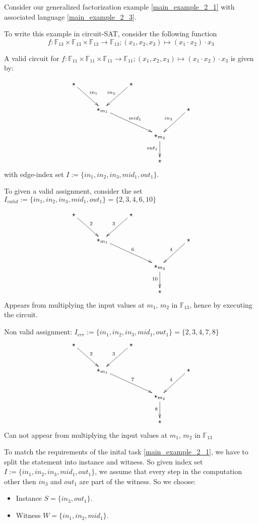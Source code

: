 \begin{example}
\label{main_example_2_4}
Consider our generalized factorization example \ref{main_example_2_1} with associated language \ref{main_example_2_3}.

To write this example in circuit-SAT, consider the following function 
\[
f:\mathbb{F}_{13}\times\mathbb{F}_{13}\times\mathbb{F}_{13}\to\mathbb{F}_{13};(x_{1},x_{2},x_{3})\mapsto(x_{1}\cdot x_{2})\cdot x_{3}
\]

A valid circuit for $f:\mathbb{F}_{11}\times\mathbb{F}_{11}\times\mathbb{F}_{11}\to\mathbb{F}_{11};(x_{1},x_{2},x_{3})\mapsto(x_{1}\cdot x_{2})\cdot x_{3}$ is given by:

\[
\xymatrix{\star\ar^{in_1}[dr] &  & \star\ar_{in_2}[dl]\\
 & \star_{m_1}\ar^{mid_1}[drr] &   & & \star\ar_{in_3}[dl]\\
  &  &  & \star_{m_2}\ar_{out_1}[d]\\
  &  &  & \star
}
\]
with edge-index set $I:=\{in_{1},in_{2},in_{3},mid_{1},out_{1}\}$.

To given a valid assignment, consider the set $I_{valid}:=\{in_{1},in_{2},in_{3},mid_{1},out_{1}\} = \{2,3,4,6,10\}$

\[
\xymatrix{\star\ar^{2}[dr] &  & \star\ar_{3}[dl]\\
 & \star_{m_1}\ar^{6}[drr] &   & & \star\ar_{4}[dl]\\
  &  &  & \star_{m_2}\ar_{10}[d]\\
  &  &  & \star
}
\]
Appears from multiplying the input values at $m_1$, $m_2$ in $\mathbb{F}_{13}$, hence by executing the circuit.

Non valid assignment: $I_{err}:=\{in_{1},in_{2},in_{3},mid_{1},out_{1}\} =\{2,3,4,7,8\}$
\[
\xymatrix{\star\ar^{2}[dr] &  & \star\ar_{3}[dl]\\
 & \star_{m_1}\ar^{7}[drr] &   & & \star\ar_{4}[dl]\\
  &  &  & \star_{m_2}\ar_{8}[d]\\
  &  &  & \star
}
\]
Can not appear from multiplying the input values at $m_1$, $m_2$ in $\mathbb{F}_{13}$

To match the requirements of the inital task \ref{main_example_2_1}, we have to split the statement into instance and witness. So given index set $I:=\{in_{1},in_{2},in_{3},mid_{1},out_{1}\}$, we assume that every step in the computation other then $in_3$ and $out_1$ are part of the witness. So we choose:
\begin{itemize}
\item Instance $S=\{in_3, out_1\}$. 
\item Witness $W=\{in_1, in_2, mid_{1}\}$.
\end{itemize}
\end{example}

